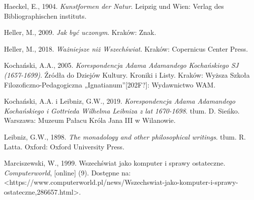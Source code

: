 \documentclass[a4paper]{article}
\newcommand\textstyleDomylnaczcionkaakapitu[1]{#1}
\begin{document}
\textstyleDomylnaczcionkaakapitu{Haeckel, E., 1904. \textit{Kunstformen der Natur}. Leipzig und Wien: Verlag des
Bibliographischen instituts.}

Heller, M., 2009. \textstyleDomylnaczcionkaakapitu{\textit{Jak być uczonym}}. Kraków: Znak.

Heller, M., 2018. \textstyleDomylnaczcionkaakapitu{\textit{Ważniejsze niż Wszechświat}}. Kraków: Copernicus Center
Press.

Kochański, A.A., 2005. \textstyleDomylnaczcionkaakapitu{\textit{Korespondencja Adama Adamandego Kochańskiego SJ
(1657-1699)}}. Źródła do Dziejów Kultury. Kroniki i Listy. Kraków: Wyższa Szkoła Filozoficzno-Pedagogiczna
„Ignatianum”[202F?]: Wydawnictwo WAM.

{\color[rgb]{0.80784315,0.09411765,0.11764706}
Kochański, A.A. i Leibniz, G.W., 2019. \textit{Korespondencja Adama Adamandego Kochańskiego i Gottrieda Wilhelma
Leibniza z lat 1670-1698}. tłum. D. Sieńko. Warszawa: Muzeum Pałacu Króla Jana III w Wilanowie.}

\textstyleDomylnaczcionkaakapitu{Leibniz, G.W., 1898. \textit{The monadology and other philosophical writings}. tłum.
}R. Latta. Oxford: Oxford University Press.

Marciszewski, W., 1999. Wszechświat jako komputer i sprawy ostateczne.
\textstyleDomylnaczcionkaakapitu{\textit{Computerworld}}, [online] (9). Dostępne na:
{\textless}https://www.computerworld.pl/news/Wszechswiat-jako-komputer-i-sprawy-ostateczne,286657.html{\textgreater}.
\end{document}
